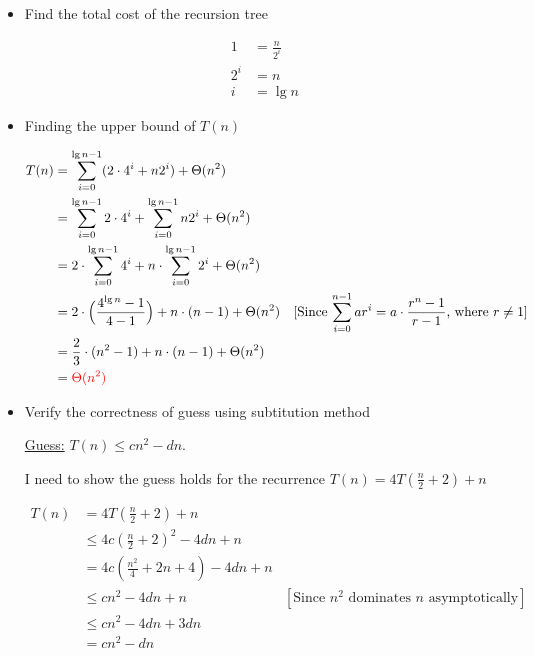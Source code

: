 \documentclass[12pt]{article}
\begin{document}
\begin{enumerate}[1.]
\begin{mdframed}
            \begin{itemize}
                \item Find the total cost of the recursion tree

                \begin{align}
                    1 &= \frac{n}{2^i}\\
                    2^i &= n\\
                    i &= \lg n
                \end{align}

                \item Finding the upper bound of $T(n)$

                \begin{align}
                    T(n) &=  \sum\limits_{i=0}^{\lg n - 1} (2 \cdot 4^i + n2^i) + \Theta(n^2)\\
                    &= \sum\limits_{i=0}^{\lg n - 1} 2 \cdot 4^i + \sum\limits_{i=0}^{\lg n - 1} n2^i + \Theta(n^2)\\
                    &= 2 \cdot \sum\limits_{i=0}^{\lg n - 1} 4^i + n \cdot \sum\limits_{i=0}^{\lg n - 1} 2^i + \Theta(n^2)\\
                    &= 2 \cdot \Bigl( \frac{4^{\lg n} - 1}{4 - 1} \Bigr) + n \cdot ( n - 1) + \Theta(n^2) & [\text{Since $\sum\limits_{i=0}^{n-1} ar^i = a \cdot \frac{r^n - 1}{r - 1}$, where $r \neq 1$}]\\
                    &= \frac{2}{3} \cdot ( n^2 - 1)+ n \cdot (n - 1) + \Theta(n^2)\\
                    &= \color{red}\Theta(n^2)\color{black}
                \end{align}

                \item Verify the correctness of guess using subtitution method

                \bigskip

                \underline{Guess:} $T(n) \leq cn^2 - dn$.

                \bigskip

                I need to show the guess holds for the recurrence $T(n) = 4T(\frac{n}{2} +2) + n$

                \bigskip

                \begin{align}
                    T(n) &= 4T(\frac{n}{2} +2) + n\\
                    &\leq 4c (\frac{n}{2} + 2)^2 - 4dn  + n\\
                    &= 4c (\frac{n^2}{4} + 2n + 4) - 4dn  + n\\
                    &\leq cn^2 - 4dn  + n & [\text{Since $n^2$ dominates $n$ asymptotically}]\\
                    &\leq cn^2 - 4dn  + 3dn\\
                    &= cn^2 - dn
                \end{align}


\end{itemize}
\end{mdframed}
\end{enumerate}
\end{document}
